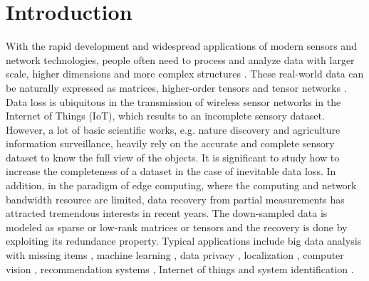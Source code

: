 \documentclass[format=acmsmall, review=false, screen=true]{acmart}
\begin{document}

%
%






\maketitle

\renewcommand{\shortauthors}{T. Zhang et al.}



\section{Introduction}
With the rapid development and widespread applications of modern sensors and network technologies, people often need to process and analyze data with larger scale, higher dimensions and more complex structures \cite{baraniuk2011more}. These real-world data can be naturally expressed as matrices, higher-order tensors and tensor networks \cite{cichocki2015tensor}. Data loss is ubiquitous in the transmission of wireless sensor networks in the Internet of Things (IoT), which results to an incomplete
sensory dataset. However, a lot of basic scientific works, e.g. nature discovery and agriculture information surveillance, heavily rely on the accurate and complete sensory dataset to know the full view of the objects. It is significant to study how to increase the completeness of a dataset in the case of inevitable data loss. In addition, in the paradigm of edge computing, where the computing and network bandwidth resource are limited, data recovery from partial measurements
\cite{candes2006robust} has attracted tremendous interests in recent years. The down-sampled data is modeled as sparse or low-rank matrices or tensors and the recovery is done by exploiting its redundance property. Typical applications include big data analysis with missing items \cite{little2014statistical}, machine learning \cite{signoretto2014learning}, data privacy \cite{kong2015privacy}, localization \cite{liu2016adaptive} \cite{rallapalli2010exploiting}, computer vision \cite{chen2004recovering} \cite{liu2013tensor},  recommendation systems \cite{koren2009matrix}, Internet of things \cite{kong2013data} \cite{liu2015cdc} \cite{liu2017ls} and system identification \cite{liu2009interior}.
\end{document}
